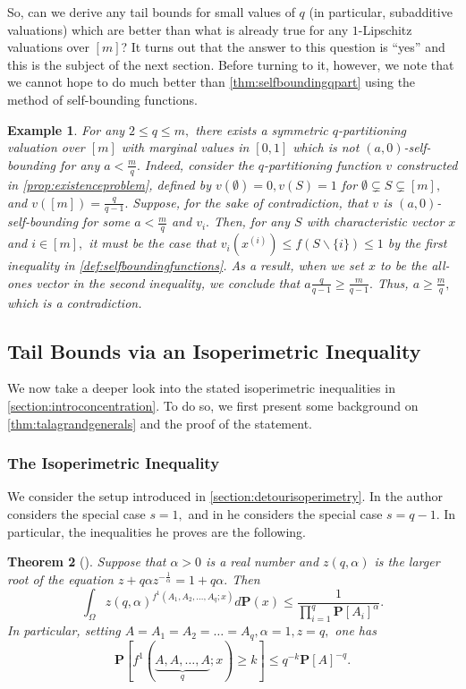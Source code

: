 \documentclass[11pt]{article}%
\newtheorem{theorem}{Theorem}
\newtheorem{example}[theorem]{Example}
\numberwithin{theorem}{subsection}
\newcommand{\prob}{\mathbf{P}}
\begin{document}
\noindent
So, can we derive any tail bounds for
small values of $q$ (in particular, subadditive valuations) which are better than what is already true for any $1$-Lipschitz valuations over $[m]$? It turns out that the answer to this question is ``yes'' and this is the subject of the next section. Before turning to it, however, we note that we cannot hope to do much better than \cref{thm:selfboundingqpart}
using the method of self-bounding functions.

\begin{example}
\normalfont
For any $2\le q\le m,$ there exists a symmetric $q$-partitioning valuation over $[m]$ with marginal values in $[0,1]$ which is not $(a,0)$-self-bounding for any $a<\frac{m}{q}.$ Indeed, consider the $q$-partitioning function $v$ constructed in \cref{prop:existenceproblem}, defined by $v(\emptyset) = 0, v(S) = 1$ for $\emptyset \subsetneq S\subsetneq [m],$ and 
$v([m]) = \frac{q}{q-1}.$ Suppose, for the sake of contradiction, that $v$ is $(a,0)$-self-bounding for some $a<\frac{m}{q}$ and $v_i.$
Then, for any $S$ with characteristic vector $x$ and $i\in [m],$ it must be the case that $v_i(x^{(i)})\le f(S\backslash \{i\}) \le 1$ by the first inequality in \cref{def:selfboundingfunctions}. As a result, when we set $x$ to be the all-ones vector in the second inequality, we conclude that $a\frac{q}{q-1}\ge \frac{m}{q-1}.$ Thus, $a\ge \frac{m}{q},$ which is a contradiction.
\end{example}

\subsection{Tail Bounds via an Isoperimetric Inequality}
We now 
take a deeper look into the stated isoperimetric inequalities in \cref{section:introconcentration}. To do so, we first present some background on
\cref{thm:talagrandgenerals} and the proof of the statement. 
\subsubsection{The Isoperimetric Inequality}
We consider the setup introduced in \cref{section:detourisoperimetry}.
In \cite[Section 3.1.1]{Talagrand01} the author considers the special case $s = 1,$ and in \cite[Section 5.7]{Talagrand96} he considers the special case $s = q-1.$ In particular, the inequalities he proves are the following.

\begin{theorem}[{\cite[Section 3.2]{Talagrand01}}]
\label{thm:talagrands1} Suppose that $\alpha>0$ is a real number and $z(q,\alpha)$ is the larger root of the equation $z+q\alpha z^{-\frac{1}{\alpha}} = 1+q\alpha.$
Then
$$
\int_{\Omega}
z(q,\alpha)^{f^1(A_1, A_2, \ldots, A_q; x)}d\prob(x)\le 
\frac{1}{\prod_{i=1}^q \prob[A_i]^\alpha}.
$$
In particular, setting $A= A_1 = A_2= \ldots = A_q, \alpha = 1, z= q,$ one has
$$\prob[f^1(\underbrace{A, A, \ldots, A}_{q}; x)\ge k]\le 
q^{-k}\prob[A]^{-q}.$$
\end{theorem}
\end{document}
